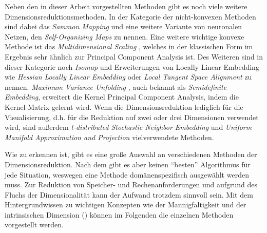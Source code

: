 Neben den in dieser Arbeit vorgestellten Methoden gibt es noch viele weitere
Dimensionsreduktionsmethoden. In der Kategorie der nicht-konvexen Methoden sind dabei das
\textit{Sammon Mapping} \parencite{Sammon.1969} und eine weitere Variante von neuronalen Netzen, den \textit{Self-Organizing
	Maps} \parencite{Kohonen.1990} zu nennen. Eine weitere wichtige konvexe Methode ist das
\textit{Multidimensional Scaling} \parencites{Kruskal.1964}{Cox.2008}, welches in der klassischen Form im Ergebnis sehr ähnlich zur
Principal Component Analysis ist. Des Weiteren sind in dieser Kategorie noch \textit{Isomap} \parencite{Tenenbaum.2000} und Erweiterungen von Locally Linear Embedding wie \textit{Hessian Locally
	Linear Embedding} \parencite{Donoho.2003} oder \textit{Local Tangent Space Alignment} \parencite{Zhang.2002} zu nennen. \textit{Maximum Variance Unfolding} \parencite{Weinberger.2006}, auch bekannt als \textit{Semidefinite Embedding}, erweitert die Kernel
Principal Component Analysis, indem die Kernel-Matrix gelernt wird. Wenn die Dimensionsreduktion
lediglich für die Visualisierung, d.h. für die Reduktion auf zwei oder drei Dimensionen verwendet
wird, sind außerdem \textit{t-distributed Stochastic Neighbor Embedding} \parencite{vanderMaaten.2008} und \textit{Uniform Manifold Approximation and Projection} \parencite{McInnes.2018} vielverwendete Methoden.

Wie zu erkennen ist, gibt es eine große Auswahl an verschiedenen Methoden der Dimensionsreduktion.
Nach dem  \parencite{Wolpert.1997} gibt es aber keinen \enquote{besten} Algorithmus für jede Situation, weswegen
eine Methode domänenspezifisch ausgewählt werden muss. Zur Reduktion von Speicher- und
Rechenanforderungen und aufgrund des Fluchs der Dimensionalität kann der Aufwand trotzdem sinnvoll
sein. Mit dem Hintergrundwissen zu wichtigen Konzepten wie der Mannigfaltigkeit und der
intrinsischen Dimension () können im
Folgenden die einzelnen Methoden vorgestellt werden.